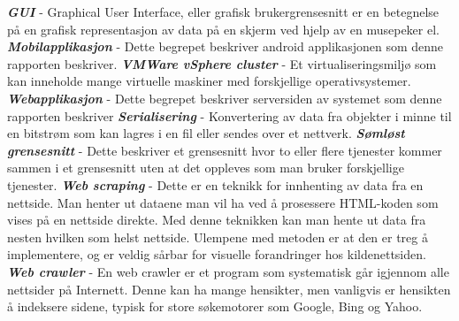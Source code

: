 \documentclass[../main.tex]{subfiles}
\begin{document}
\newline
\textbf{\textit{GUI}} - Graphical User Interface, eller grafisk brukergrensesnitt er en betegnelse på en grafisk representasjon av data på en skjerm ved hjelp av en musepeker el.\newline
\newline
\textbf{\textit{Mobilapplikasjon}} - Dette begrepet beskriver android applikasjonen som denne rapporten beskriver.\newline
\newline
\textbf{\textit{VMWare vSphere cluster}} - Et virtualiseringsmiljø som kan inneholde mange virtuelle maskiner med forskjellige operativsystemer.  \newline
\newline
\textbf{\textit{Webapplikasjon}} - Dette begrepet beskriver serversiden av systemet som denne rapporten beskriver\newline
\newline
\textbf{\textit{Serialisering}} - Konvertering av data fra objekter i minne til en bitstrøm som kan lagres i en fil eller sendes over et nettverk.  \newline
\newline
\textbf{\textit{Sømløst grensesnitt}} - Dette beskriver et grensesnitt hvor to eller flere tjenester kommer sammen i et grensesnitt uten at det oppleves som man bruker forskjellige tjenester. \newline
\newline
\textbf{\textit{Web scraping}} - Dette er en teknikk for innhenting av data fra en nettside. Man henter ut dataene man vil ha ved å prosessere HTML-koden som vises på en nettside direkte. Med denne teknikken kan man hente ut data fra nesten hvilken som helst nettside. Ulempene med metoden er at den er treg å implementere, og er veldig sårbar for visuelle forandringer hos kildenettsiden.  \newline
\newline
\textbf{\textit{Web crawler}} - En web crawler er et program som systematisk går igjennom alle nettsider på Internett. Denne kan ha mange hensikter, men vanligvis er hensikten å indeksere sidene, typisk for store søkemotorer som Google, Bing og Yahoo.  \newline
\newline
\end{document}
